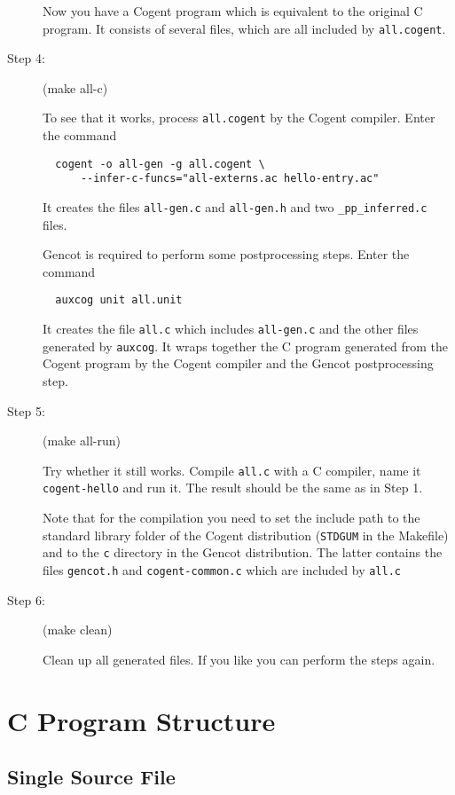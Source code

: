 \documentclass[a4paper]{report}
\newcommand{\code}[1]{\textnormal{\texttt{#1}}}
\begin{document}
\begin{description}
Now you have a Cogent program which is equivalent to the original C program. It consists of several files,
which are all included by \code{all.cogent}.

\item[Step 4:] (make all-c)

To see that it works, process \code{all.cogent} by the Cogent compiler. Enter the command
\begin{verbatim}
  cogent -o all-gen -g all.cogent \
      --infer-c-funcs="all-externs.ac hello-entry.ac"
\end{verbatim}
It creates the files \code{all-gen.c} and \code{all-gen.h} and two \code{\_pp\_inferred.c} files. 

Gencot is required to perform some postprocessing steps. Enter the command
\begin{verbatim}
  auxcog unit all.unit
\end{verbatim}
It creates the file \code{all.c} which includes \code{all-gen.c} and the other files generated by \code{auxcog}. It wraps together 
the C program generated from the Cogent program by the Cogent compiler and the Gencot postprocessing step.

\item[Step 5:] (make all-run)

Try whether it still works. Compile \code{all.c} with a C compiler, name it \code{cogent-hello} and run it. The result should be the same
as in Step 1.

Note that for the compilation you need to set the include path to the standard library folder of the Cogent 
distribution (\code{STDGUM} in the Makefile) and to the \code{c} directory in the Gencot distribution. The latter contains the files
\code{gencot.h} and \code{cogent-common.c} which are included by \code{all.c}

\item[Step 6:] (make clean)

Clean up all generated files. If you like you can perform the steps again.
\end{description}

\chapter{C Program Structure}
\label{struct}

\section{Single Source File}
\label{struct-single}
\end{document}
